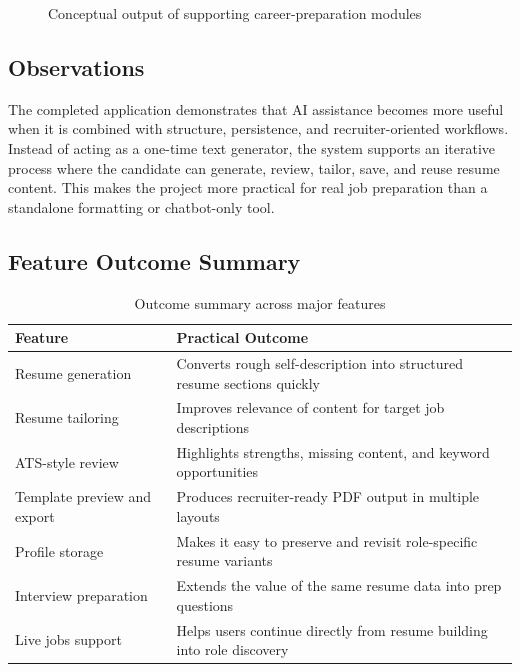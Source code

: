 \begin{figure}[H]
\centering
{}
\caption{Conceptual output of supporting career-preparation modules}
\end{figure}

\subsection{Observations}
\noindent The completed application demonstrates that AI assistance becomes more useful when it is combined with structure, persistence, and recruiter-oriented workflows. Instead of acting as a one-time text generator, the system supports an iterative process where the candidate can generate, review, tailor, save, and reuse resume content. This makes the project more practical for real job preparation than a standalone formatting or chatbot-only tool.

\subsection{Feature Outcome Summary}
\begin{table}[H]
\centering
\caption{Outcome summary across major features}
\begin{tabular}{|p{3.6cm}|p{7.0cm}|}
\hline
\textbf{Feature} & \textbf{Practical Outcome} \\
\hline
Resume generation & Converts rough self-description into structured resume sections quickly \\
\hline
Resume tailoring & Improves relevance of content for target job descriptions \\
\hline
ATS-style review & Highlights strengths, missing content, and keyword opportunities \\
\hline
Template preview and export & Produces recruiter-ready PDF output in multiple layouts \\
\hline
Profile storage & Makes it easy to preserve and revisit role-specific resume variants \\
\hline
Interview preparation & Extends the value of the same resume data into prep questions \\
\hline
Live jobs support & Helps users continue directly from resume building into role discovery \\
\hline
\end{tabular}
\end{table}

